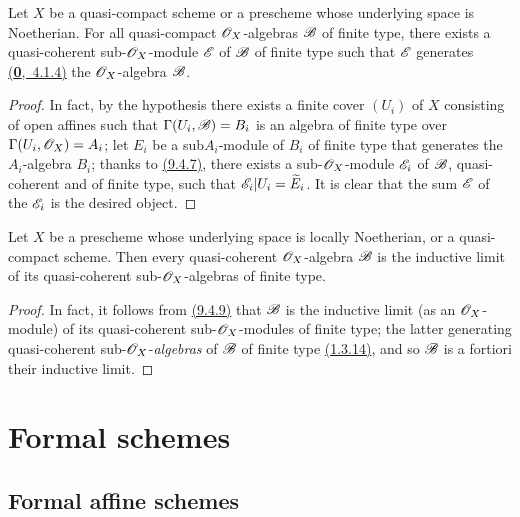 \begin{prop}[9.6.5]
\label{prop-1.9.6.5}
Let $X$ be a quasi-compact scheme or a prescheme whose underlying space is Noetherian.
For all quasi-compact $\mathscr{O}_X$-algebras $\mathscr{B}$ of finite type, there exists a quasi-coherent sub-$\mathscr{O}_X$-module $\mathscr{E}$ of $\mathscr{B}$ of finite type such that $\mathscr{E}$ generates \hyperref[env-0.4.1.4]{(\textbf{0},~4.1.4)} the $\mathscr{O}_X$-algebra $\mathscr{B}$.
\end{prop}

\begin{proof}
\label{proof-prop-1.9.6.5}
In fact, by the hypothesis there exists a finite cover $(U_i)$ of $X$ consisting of open affines such that $\Gamma(U_i,\mathscr{B})=B_i$ is an algebra of finite type over $\Gamma(U_i,\mathscr{O}_X)=A_i$; let $E_i$ be a sub$A_i$-module of $B_i$ of finite type that generates the $A_i$-algebra $B_i$; thanks to \hyperref[thm-1.9.4.7]{(9.4.7)}, there exists a sub-$\mathscr{O}_X$-module $\mathscr{E}_i$ of $\mathscr{B}$, quasi-coherent and of finite type, such that $\mathscr{E}_i|U_i=\widetilde{E}_i$.
It is clear that the sum $\mathscr{E}$ of the $\mathscr{E}_i$ is the desired object.
\end{proof}

\begin{prop}[9.6.6]
\label{prop-1.9.6.6}
Let $X$ be a prescheme whose underlying space is locally Noetherian, or a quasi-compact scheme.
Then every quasi-coherent $\mathscr{O}_X$-algebra $\mathscr{B}$ is the inductive limit of its quasi-coherent sub-$\mathscr{O}_X$-algebras of finite type.
\end{prop}

\begin{proof}
\label{proof-prop-1.9.6.6}
In fact, it follows from \hyperref[cor-1.9.4.9]{(9.4.9)} that $\mathscr{B}$ is the inductive limit (as an $\mathscr{O}_X$-module) of its quasi-coherent sub-$\mathscr{O}_X$-modules of finite type; the latter generating quasi-coherent sub-$\mathscr{O}_X$-\emph{algebras} of $\mathscr{B}$ of finite type \hyperref[env-1.1.3.14]{(1.3.14)}, and so $\mathscr{B}$ is a fortiori their inductive limit.
\end{proof}

\section{Formal schemes}
\label{section-formal-schemes}

\subsection{Formal affine schemes}
\label{subsection-formal-affine-schemes}

